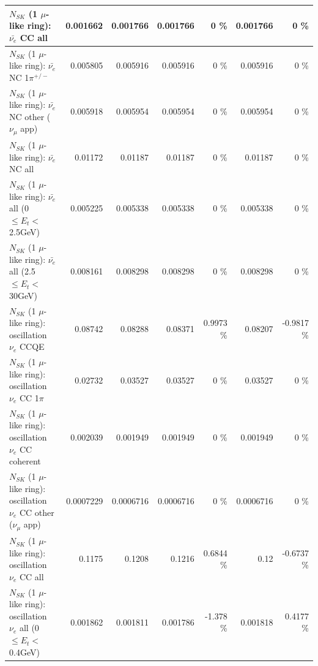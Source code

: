 \begin{table}
\begin{tabular}{| l | r | r | r  r | r  r |}
                            $N_{SK}$ (1 $\mu$-like ring): $\bar{\nu_{e}}$ CC all &        0.001662 &        0.001766 &        0.001766 &        0 \%  &        0.001766 &        0 \%  \\ 
\hline
                     $N_{SK}$ (1 $\mu$-like ring): $\bar{\nu_e}$ NC 1$\pi^{+/-}$ &        0.005805 &        0.005916 &        0.005916 &        0 \%  &        0.005916 &        0 \%  \\ 
            $N_{SK}$ (1 $\mu$-like ring): $\bar{\nu_e}$ NC other ($\nu_\mu$ app) &        0.005918 &        0.005954 &        0.005954 &        0 \%  &        0.005954 &        0 \%  \\ 
                            $N_{SK}$ (1 $\mu$-like ring): $\bar{\nu_{e}}$ NC all &         0.01172 &         0.01187 &         0.01187 &        0 \%  &         0.01187 &        0 \%  \\ 
\hline
     $N_{SK}$ (1 $\mu$-like ring): $\bar{\nu_{e}}$ all (0 $\leq E_{t} <$ 2.5GeV) &        0.005225 &        0.005338 &        0.005338 &        0 \%  &        0.005338 &        0 \%  \\ 
    $N_{SK}$ (1 $\mu$-like ring): $\bar{\nu_{e}}$ all (2.5 $\leq E_{t} <$ 30GeV) &        0.008161 &        0.008298 &        0.008298 &        0 \%  &        0.008298 &        0 \%  \\ 
\hline
\hline
\hline
                          $N_{SK}$ (1 $\mu$-like ring): oscillation $\nu_e$ CCQE &         0.08742 &         0.08288 &         0.08371 &   0.9973 \%  &         0.08207 &  -0.9817 \%  \\ 
                     $N_{SK}$ (1 $\mu$-like ring): oscillation $\nu_e$ CC 1$\pi$ &         0.02732 &         0.03527 &         0.03527 &        0 \%  &         0.03527 &        0 \%  \\ 
                   $N_{SK}$ (1 $\mu$-like ring): oscillation $\nu_e$ CC coherent &        0.002039 &        0.001949 &        0.001949 &        0 \%  &        0.001949 &        0 \%  \\ 
      $N_{SK}$ (1 $\mu$-like ring): oscillation $\nu_e$ CC other ($\nu_\mu$ app) &       0.0007229 &       0.0006716 &       0.0006716 &        0 \%  &       0.0006716 &        0 \%  \\ 
                       $N_{SK}$ (1 $\mu$-like ring): oscillation $\nu_e$  CC all &          0.1175 &          0.1208 &          0.1216 &   0.6844 \%  &            0.12 &  -0.6737 \%  \\ 
\hline
$N_{SK}$ (1 $\mu$-like ring): oscillation $\nu_{e}$ all (0 $\leq E_{t} <$ 0.4GeV) &        0.001862 &        0.001811 &        0.001786 &   -1.378 \%  &        0.001818 &   0.4177 \%  \\ 

\end{tabular}
\end{table}
